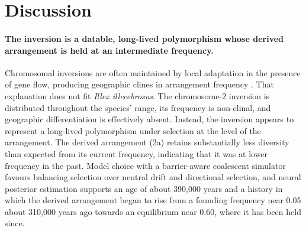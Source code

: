 \documentclass[11pt]{article}
\newcommand{\illex}{\textit{Illex illecebrosus}}
\begin{document}
\section{Discussion}

\paragraph{The inversion is a datable, long-lived polymorphism whose derived arrangement is held at an intermediate frequency.}
Chromosomal inversions are often maintained by local adaptation in the presence of gene flow, producing geographic clines in arrangement frequency \citep{kirkpatrick2006,lowry2010,faria2019}. That explanation does not fit \illex{}. The chromosome-2 inversion is distributed throughout the species' range, its frequency is non-clinal, and geographic differentiation is effectively absent. Instead, the inversion appears to represent a long-lived polymorphism under selection at the level of the arrangement. The derived arrangement (2a) retains substantially less diversity than expected from its current frequency, indicating that it was at lower frequency in the past. Model choice with a barrier-aware coalescent simulator favours balancing selection over neutral drift and directional selection, and neural posterior estimation supports an age of about 390{,}000 years and a history in which the derived arrangement began to rise from a founding frequency near 0.05 about 310{,}000 years ago towards an equilibrium near 0.60, where it has been held since.
\end{document}
